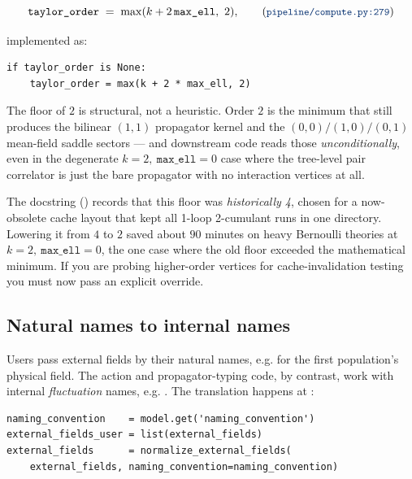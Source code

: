 \begin{equation}
  \texttt{taylor\_order} \;=\; \max(k + 2\,\texttt{max\_ell},\ 2),
  \qquad\text{(\file{pipeline/compute.py:279})}
  \label{eq:co-taylor}
\end{equation}

implemented as:

\begin{lstlisting}
if taylor_order is None:
    taylor_order = max(k + 2 * max_ell, 2)
\end{lstlisting}

The floor of $2$ is structural, not a heuristic. Order $2$ is the minimum that
still produces the bilinear $(1,1)$ propagator kernel and the
$(0,0)/(1,0)/(0,1)$ mean-field saddle sectors --- and downstream code reads those
\emph{unconditionally}, even in the degenerate $k=2,\ \texttt{max\_ell}=0$ case
where the tree-level pair correlator is just the bare propagator with no
interaction vertices at all.

\begin{note}
The docstring () records that this floor was
\emph{historically 4}, chosen for a now-obsolete cache layout that kept all
1-loop 2-cumulant runs in one directory. Lowering it from $4$ to $2$ saved about
$90$ minutes on heavy Bernoulli theories at $k=2,\ \texttt{max\_ell}=0$, the one
case where the old floor exceeded the mathematical minimum. If you are probing
higher-order vertices for cache-invalidation testing you must now pass an
explicit  override.
\end{note}

\subsection{Natural names to internal names}

Users pass external fields by their natural names, e.g.  for the
first population's physical field. The action and propagator-typing code, by
contrast, work with internal \emph{fluctuation} names, e.g. . The
translation happens at :

\begin{lstlisting}
naming_convention    = model.get('naming_convention')
external_fields_user = list(external_fields)
external_fields      = normalize_external_fields(
    external_fields, naming_convention=naming_convention)
\end{lstlisting}

